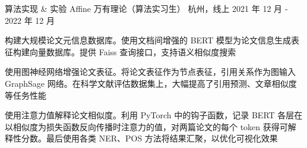 

\begin{cventries}

  \cventry
    {算法实现 \& 实验} %
    {Affine 万有理论（算法实习生）} %
    {杭州，线上} %
    { 2021 年 12 月 ‑ 2022 年 12 月} %
    {
      \begin{cvitems} %
        \item {构建大规模论文元信息数据库。使用文档间增强的 BERT 模型为论文信息生成表征构建向量数据库。提供 Faiss 查询接口，支持语义相似度搜索}
        \item {使用图神经网络增强论文表征。将论文表征作为节点表征，引用关系作为图输入 GraphSage 网络。在科学文献评估数据集上，大幅提高了引用预测、文章相似度等任务性能}
        \item {使用注意力值解释论文相似度。利用 PyTorch 中的钩子函数，记录 BERT 各层在以相似度为损失函数反向传播时注意力的值，对两篇论文的每个 token 获得可解释性分数。最后使用各类 NER、POS 方法将结果汇聚，以优化可视化效果}
      \end{cvitems}
    }


\end{cventries}
